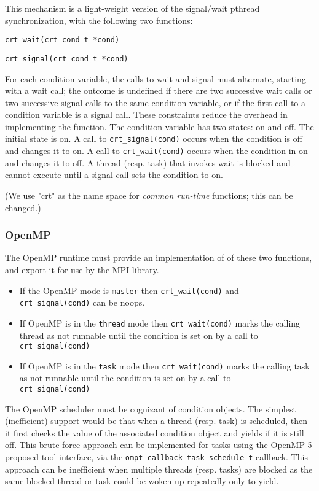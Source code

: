 This mechanism is a light-weight version of the 
signal/wait pthread synchronization, with the following two functions:

\texttt{crt\_wait(crt\_cond\_t *cond)}

\texttt{crt\_signal(crt\_cond\_t *cond)}

For each condition variable, the calls to wait and signal must alternate, 
starting with a 
wait call; the outcome is undefined if there are two successive wait calls 
or two successive signal calls to the same condition variable, or if the first 
call to a condition variable
is a signal call. 
These constraints reduce the overhead in implementing the function.
The condition variable  has two states: on and off. The initial state is 
on. A call to 
\texttt{crt\_signal(cond)} occurs when the condition is off  and changes it 
to 
on. A call 
to 
\texttt{crt\_wait(cond)} occurs when the condition in on
and changes it to off. 
A thread (resp. task) that invokes wait is blocked and cannot execute until a 
signal call sets the condition to on.

 (We use "crt" as the name space for \emph{common run-time} functions; this can 
 be changed.)
	
\subsubsection{OpenMP}

The OpenMP runtime must provide an implementation of of these two functions, 
and export it for use by the MPI library.

\begin{itemize}
	\item 
If the OpenMP mode is \texttt{master} then \texttt{crt\_wait(cond)}  and\\
\texttt{crt\_signal(cond)} can be noops. 
\item
If OpenMP is in the \texttt{thread} mode then \texttt{crt\_wait(cond)}  marks 
the calling thread as not runnable until the condition is set on by a call to 
\texttt{crt\_signal(cond)}
\item
If OpenMP is in the \texttt{task} mode then \texttt{crt\_wait(cond)}  marks 
the calling task as not runnable until the condition is set on by a call to\\
\texttt{crt\_signal(cond)}
\end{itemize}	
 
The OpenMP scheduler must be cognizant of condition objects. The simplest 
(inefficient) support would be that when a thread (resp. task) is scheduled, 
then it first checks the value of the associated condition object and yields if 
it is 
still 
off. This brute force approach can be implemented for tasks using the 
OpenMP 5 
proposed tool interface, via the \texttt{ompt\_callback\_task\_schedule\_t} 
callback. This approach can be inefficient when multiple threads (resp. tasks) 
are blocked as the same blocked thread or task could be woken up repeatedly 
only to yield.

